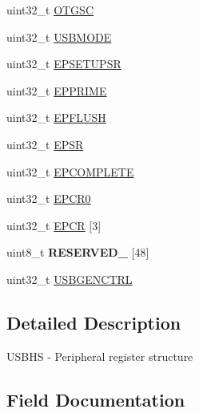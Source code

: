 \begin{DoxyCompactItemize}
\item 
uint32\+\_\+t \hyperlink{struct_u_s_b_h_s___mem_map_ae9adf962bc23fed9d7a56e8c05431560}{O\+T\+G\+S\+C}
\item 
uint32\+\_\+t \hyperlink{struct_u_s_b_h_s___mem_map_afe4ec3963906653c83890dea008fac84}{U\+S\+B\+M\+O\+D\+E}
\item 
uint32\+\_\+t \hyperlink{struct_u_s_b_h_s___mem_map_aaed4061c317598d41086fceed6b848ad}{E\+P\+S\+E\+T\+U\+P\+S\+R}
\item 
uint32\+\_\+t \hyperlink{struct_u_s_b_h_s___mem_map_a15b207ed583494bf9e0ed363c0b974bf}{E\+P\+P\+R\+I\+M\+E}
\item 
uint32\+\_\+t \hyperlink{struct_u_s_b_h_s___mem_map_a3798ba6cc78e9af879cb2364d3a5b7e3}{E\+P\+F\+L\+U\+S\+H}
\item 
uint32\+\_\+t \hyperlink{struct_u_s_b_h_s___mem_map_a23262d41b8f4edae108e4c553c81768e}{E\+P\+S\+R}
\item 
uint32\+\_\+t \hyperlink{struct_u_s_b_h_s___mem_map_a6e662d447a64545a849155847fd1850d}{E\+P\+C\+O\+M\+P\+L\+E\+T\+E}
\item 
uint32\+\_\+t \hyperlink{struct_u_s_b_h_s___mem_map_a869ec293a891b396768ce4ddab734381}{E\+P\+C\+R0}
\item 
uint32\+\_\+t \hyperlink{struct_u_s_b_h_s___mem_map_a529476b6d37196816091e756fb78dc7f}{E\+P\+C\+R} \mbox{[}3\mbox{]}
\item 
\hypertarget{struct_u_s_b_h_s___mem_map_afdf35e4a76a3b816d99610b02dabaab5}{}uint8\+\_\+t {\bfseries R\+E\+S\+E\+R\+V\+E\+D\+\_} \mbox{[}48\mbox{]}\label{struct_u_s_b_h_s___mem_map_afdf35e4a76a3b816d99610b02dabaab5}

\item 
uint32\+\_\+t \hyperlink{struct_u_s_b_h_s___mem_map_ae42001e4a7aa4fcd7721a0ee4c4fe3f5}{U\+S\+B\+G\+E\+N\+C\+T\+R\+L}
\end{DoxyCompactItemize}


\subsection{Detailed Description}
U\+S\+B\+H\+S -\/ Peripheral register structure 

\subsection{Field Documentation}
\hypertarget{struct_u_s_b_h_s___mem_map_a23476132035d540710e6723105472ad2}{}
